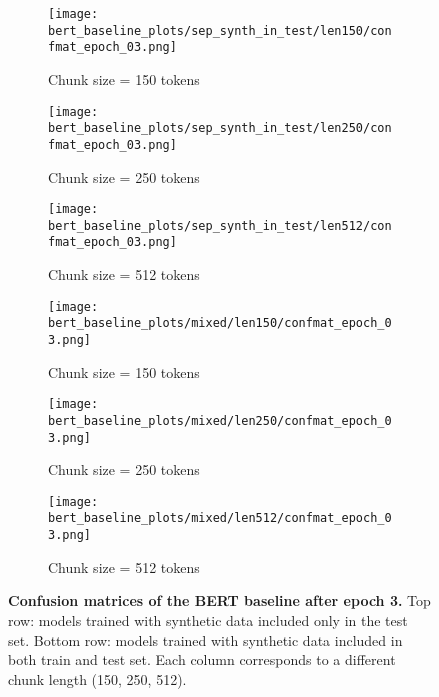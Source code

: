 \begin{figure}[H]
  \centering

  \begin{subfigure}[t]{0.32\textwidth}
    \centering
    \texttt{[image: bert\_baseline\_plots/sep\_synth\_in\_test/len150/confmat\_epoch\_03.png]}
    \caption{Chunk size = 150 tokens}
  \end{subfigure}\hfill
  \begin{subfigure}[t]{0.32\textwidth}
    \centering
    \texttt{[image: bert\_baseline\_plots/sep\_synth\_in\_test/len250/confmat\_epoch\_03.png]}
    \caption{Chunk size = 250 tokens}
  \end{subfigure}\hfill
  \begin{subfigure}[t]{0.32\textwidth}
    \centering
    \texttt{[image: bert\_baseline\_plots/sep\_synth\_in\_test/len512/confmat\_epoch\_03.png]}
    \caption{Chunk size = 512 tokens}
  \end{subfigure}

  \vspace{0.4cm}
  \begin{subfigure}[t]{0.32\textwidth}
    \centering
    \texttt{[image: bert\_baseline\_plots/mixed/len150/confmat\_epoch\_03.png]}
    \caption{Chunk size = 150 tokens}
  \end{subfigure}\hfill
  \begin{subfigure}[t]{0.32\textwidth}
    \centering
    \texttt{[image: bert\_baseline\_plots/mixed/len250/confmat\_epoch\_03.png]}
    \caption{Chunk size = 250 tokens}
  \end{subfigure}\hfill
  \begin{subfigure}[t]{0.32\textwidth}
    \centering
    \texttt{[image: bert\_baseline\_plots/mixed/len512/confmat\_epoch\_03.png]}
    \caption{Chunk size = 512 tokens}
  \end{subfigure}

  \caption[Confusion matrices of BERT baseline after epoch 3.]{\textbf{Confusion matrices of the BERT baseline after epoch 3.}  
  Top row: models trained with synthetic data included only in the test set.  
  Bottom row: models trained with synthetic data included in both train and test set.  
  Each column corresponds to a different chunk length (150, 250, 512).}
  \label{fig:bert_confusionmatrices_epoch3}
\end{figure}

